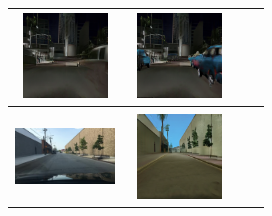 \documentclass{VUMIFPSbakalaurinis}
\begin{document}
\begin{table}[H]
{\begin{tabular}{|c|c|c|c|}
            \includegraphics[width=100,height=85]{img/mspcv2/7ce33243-6db43a7e} & 
            \includegraphics[width=100,height=85]{img/mspccar/7ce33243-6db43a7e} \\
            \hline
            \\
            \includegraphics[width=100,height=85]{img/original/7cf55c3d-9cbeb7c6} & 
            \includegraphics[width=100,height=85]{img/mspcv2/7cf55c3d-9cbeb7c6} & 

\end{tabular}}
\end{table}
\end{document}
